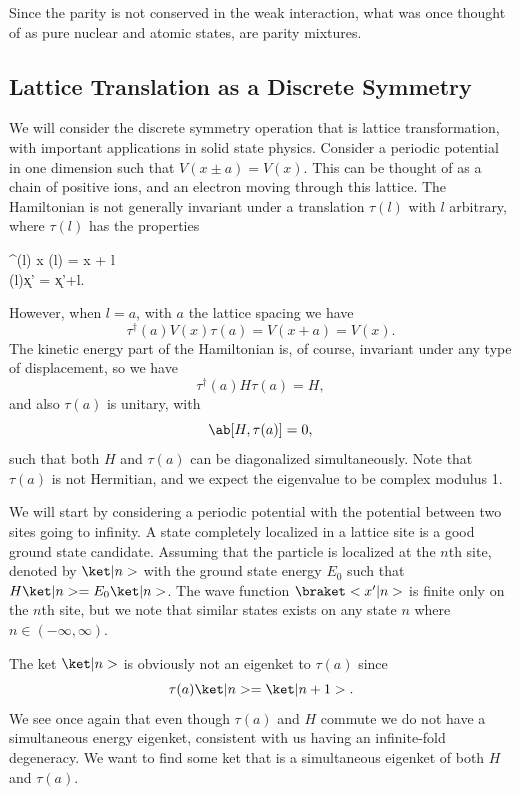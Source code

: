 Since the parity is not conserved in the weak interaction, what was once thought of as pure nuclear and atomic states, are parity mixtures.

\subsection{Lattice Translation as a Discrete Symmetry}
We will consider the discrete symmetry operation that is lattice transformation, with important applications in solid state physics. Consider a periodic potential in one dimension such that $V(x\pm a) = V(x)$. This can be thought of as a chain of positive ions, and an electron moving through this lattice. The Hamiltonian is not generally invariant under a translation $\tau(l)$ with $l$ arbitrary, where $\tau(l)$ has the properties
\begin{alphaAlign}
    \tau^\dagger(l) x \tau(l) = x + l\\
    \tau(l)\k{x'} = \k{x'+l}.
\end{alphaAlign}
However, when $l=a$, with $a$ the lattice spacing we have
\begin{equation}
    \tau^\dagger(a) V(x)\tau(a) = V(x+a) = V(x).
\end{equation}
The kinetic energy part of the Hamiltonian is, of course, invariant under any type of displacement, so we have
\begin{equation}
    \tau^\dagger(a)H\tau(a) = H,
\end{equation}
and also $\tau(a)$ is unitary, with
\begin{equation}
    \comm{H}{\tau(a)} = 0,
\end{equation}
such that both $H$ and $\tau(a)$ can be diagonalized simultaneously. Note that $\tau(a)$ is not Hermitian, and we expect the eigenvalue to be complex modulus 1.

We will start by considering a periodic potential with the potential between two sites going to infinity. A state completely localized in a lattice site is a good ground state candidate. Assuming that the particle is localized at the $n$th site, denoted by $\k{n}$ with the ground state energy $E_0$ such that $H\k{n} = E_0\k{n} $. The wave function $\bk{x'}{n}$ is finite only on the $n$th site, but we note that similar states exists on any state $n$ where $n\in(-\infty,\infty)$.

The ket $\k{n}$ is obviously not an eigenket to $\tau(a)$ since
\begin{equation}
    \tau(a)\k{n} = \k{n+1}.
\end{equation}
We see once again that even though $\tau(a)$ and $H$ commute we do not have a simultaneous energy eigenket, consistent with us having an infinite-fold degeneracy. We want to find some ket that is a simultaneous eigenket of both $H$ and $\tau(a)$.

